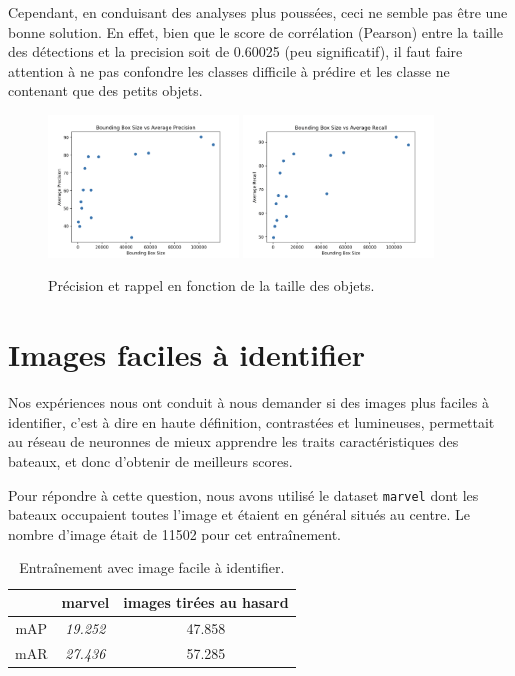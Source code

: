 Cependant, en conduisant des analyses plus poussées, ceci ne semble pas être une bonne solution.
En effet, bien que le score de corrélation  (Pearson) entre la taille des détections et la precision
soit de 0.60025 (peu significatif), il faut faire attention à ne pas confondre les classes
difficile à prédire et les classe ne contenant que des petits objets.

\begin{figure}[H]
    \centering
    \includegraphics[width=0.45\textwidth]{./img/size_precision.png}
    \includegraphics[width=0.45\textwidth]{./img/size_recall.png}
    \caption{Précision et rappel en fonction de la taille des objets.}
\end{figure}

\section{Images faciles à identifier}

Nos expériences nous ont conduit à nous demander si des images plus faciles à identifier, c'est à dire
en haute définition, contrastées et lumineuses, permettait au réseau de neuronnes de mieux apprendre les
traits caractéristiques des bateaux, et donc d'obtenir de meilleurs scores.

Pour répondre à cette question, nous avons utilisé le dataset \texttt{marvel} dont les bateaux occupaient
toutes l'image et étaient en général situés au centre. Le nombre d'image était de 11502 pour cet entraînement. \\

\begin{table}[H]
    \begin{center}
        \begin{tabular}{c c c}
            \hline
            & marvel & images tirées au hasard\\
            \hline
            mAP & \textit{19.252} & 47.858 \\
            mAR & \textit{27.436} & 57.285 \\
        \end{tabular}
    \end{center}
    \caption{Entraînement avec image facile à identifier.}
\end{table}

